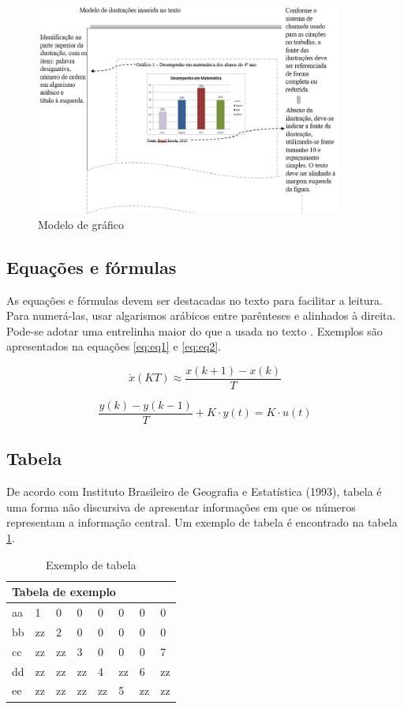 \begin{figure}[!ht]
    \centering
    \caption{Modelo de gráfico}   \label{fig:fig2}
    \includegraphics[width = 0.90\textwidth]{images/___fig2.png}
\end{figure}

\subsection{Equações e fórmulas}
As equações e fórmulas devem ser destacadas no texto para facilitar a leitura.  Para numerá-las, usar algarismos arábicos entre parênteses e alinhados à direita. Pode-se adotar uma entrelinha maior do que a usada no texto \cite{abnt14724}.
Exemplos são apresentados na equações \ref{eq:eq1} e \ref{eq:eq2}.

\begin{equation}
    \dot{x}(KT)\approx \frac{x(k+1)-x(k)}{T}
    \label{eq:eq1}
\end{equation}

\begin{equation}
    \frac{y(k)-y(k-1)}{T}+K\cdot y(t)=K\cdot u(t)
    \label{eq:eq2}
\end{equation}

\subsection{Tabela}

De acordo com Instituto Brasileiro de Geografia e Estatística (1993), tabela é uma forma não discursiva de apresentar informações em que os números representam a informação central. Um exemplo de tabela é encontrado na tabela \ref{tab:tab1}.
\begin{table}[h!]
\centering
\caption{Exemplo de tabela} \label{tab:tab1}
\begin{tabular}{llllllll} 
\hline
\multicolumn{8}{l}{Tabela de exemplo}  \\ 
\hline
aa & 1  & 0  & 0  & 0  & 0  & 0  & 0   \\ 
\hline
bb & zz & 2  & 0  & 0  & 0  & 0  & 0   \\ 
\hline
cc & zz & zz & 3  & 0  & 0  & 0  & 7   \\ 
\hline
dd & zz & zz & zz & 4  & zz & 6  & zz  \\ 
\hline
ee & zz & zz & zz & zz & 5  & zz & zz  \\
\hline
\end{tabular}
\end{table}
